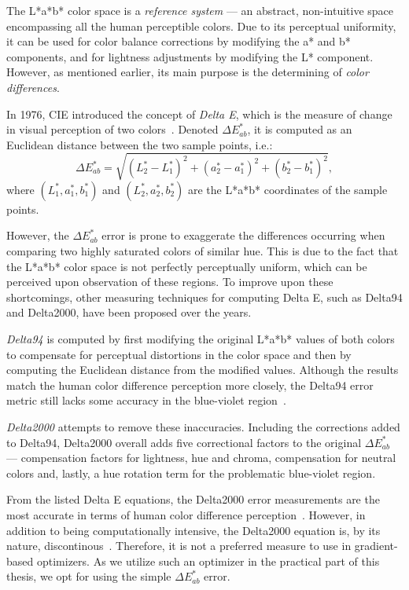 The L*a*b* color space is a \emph{reference system} --- an abstract, non-intuitive space encompassing all the human perceptible colors. Due to its perceptual uniformity, it can be used for color balance corrections by modifying the a* and b* components, and for lightness adjustments by modifying the L* component. However, as mentioned earlier, its main purpose is the determining of \emph{color differences}.

In 1976, CIE introduced the concept of \emph{Delta E}, which is the measure of change in visual perception of two colors~\cite{deltaEOverview}. Denoted $\Delta E_{ab}^*$, it is computed as an Euclidean distance between the two sample points, i.e.:
\begin{equation} \label{deltaE}
\Delta E_{ab}^*=\sqrt{(L_{2}^* - L_{1}^*)^2 + (a_{2}^* - a_{1}^*)^2 + (b_{2}^* - b_{1}^*)^2},
\end{equation}
where $(L_{1}^*,a_{1}^*,b_{1}^*)$ and $(L_{2}^*,a_{2}^*,b_{2}^*)$ are the L*a*b* coordinates of the sample points.

However, the $\Delta E_{ab}^*$ error is prone to exaggerate the differences occurring when comparing two highly saturated colors of similar hue. This is due to the fact that the L*a*b* color space is not perfectly perceptually uniform, which can be perceived upon observation of these regions. To improve upon these shortcomings, other measuring techniques for computing Delta E, such as Delta94 and Delta2000, have been proposed over the years.

\emph{Delta94} is computed by first modifying the original L*a*b* values of both colors to compensate for perceptual distortions in the color space and then by computing the Euclidean distance from the modified values. Although the results match the human color difference perception more closely, the Delta94 error metric still lacks some accuracy in the blue-violet region~\cite{deltaEOverview}.
	
\emph{Delta2000} attempts to remove these inaccuracies. Including the corrections added to Delta94, Delta2000 overall adds five correctional factors to the original $\Delta E_{ab}^*$ --- compensation factors for lightness, hue and chroma, compensation for neutral colors and, lastly, a hue rotation term for the problematic blue-violet region.

From the listed Delta E equations, the Delta2000 error measurements are the most accurate in terms of human color difference perception~\cite{deltaEOverview}. However, in addition to being computationally intensive, the Delta2000 equation is, by its nature, discontinous~\cite{delta2000Discontinuities}. Therefore, it is not a preferred measure to use in gradient-based optimizers. As we utilize such an optimizer in the practical part of this thesis, we opt for using the simple $\Delta E_{ab}^*$ error.

